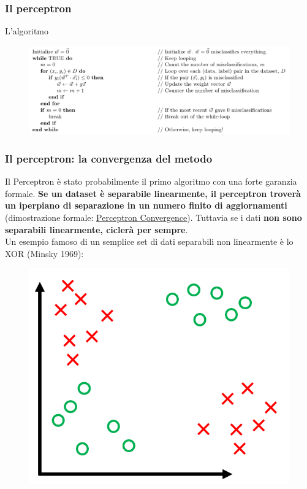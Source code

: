 \begin{frame}
	
	\frametitle{Il perceptron}
	
	\begin{block}{L'algoritmo}		
		\begin{figure}[!htbp]
			\centering
			\includegraphics[width=1.0\linewidth]{images/supervised/perceptron/perceptron_algo.png}
		\end{figure}

	\end{block}

\end{frame}


\begin{frame}
	
	\frametitle{Il perceptron: la convergenza del metodo}
	
	
		Il Perceptron è stato probabilmente il primo algoritmo con una forte garanzia formale.
		\textbf{Se un dataset è separabile linearmente, il perceptron troverà un iperpiano di separazione in un numero finito di aggiornamenti} (dimostrazione formale: \underline{\href{https://www.cs.cornell.edu/courses/cs4780/2018fa/lectures/lecturenote03.html}{Perceptron Convergence}}).
		\newlinedouble
		Tuttavia se i dati \textbf{non sono separabili linearmente, ciclerà per sempre}.\\
		Un esempio famoso di un semplice set di dati separabili non linearmente è lo XOR (Minsky 1969):
		\begin{figure}[!htbp]
			\centering
			\includegraphics[width=0.35\linewidth]{images/supervised/perceptron/perceptron_xor.png}
		\end{figure}

		


\end{frame}


